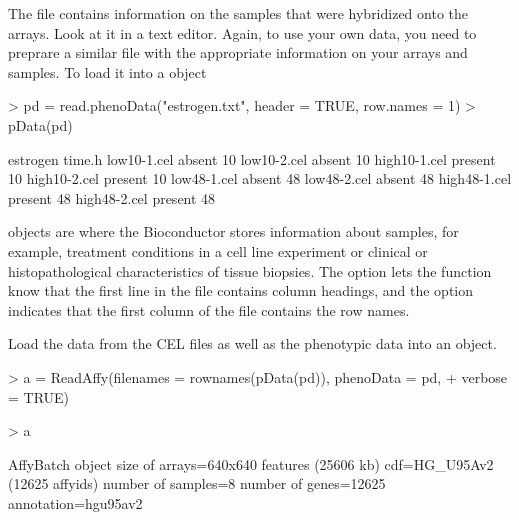 \documentclass[a4paper]{article}
\begin{document}
\begin{exercises}
\begin{exercise}
\item The file  contains information on the samples that
were hybridized onto the arrays. Look at it in a text editor. Again, to use
your own data, you need to preprare a similar file with the appropriate
information on your arrays and samples.
To load it into a  object
\begin{Schunk}
\begin{Sinput}
> pd = read.phenoData("estrogen.txt", header = TRUE, row.names = 1)
> pData(pd)
\end{Sinput}
\begin{Soutput}
             estrogen time.h
low10-1.cel    absent     10
low10-2.cel    absent     10
high10-1.cel  present     10
high10-2.cel  present     10
low48-1.cel    absent     48
low48-2.cel    absent     48
high48-1.cel  present     48
high48-2.cel  present     48
\end{Soutput}
\end{Schunk}
 objects are where the Bioconductor stores information about 
samples, for example, treatment conditions in a cell line experiment or 
clinical or histopathological characteristics of tissue biopsies. 
The  option lets the  function know that
the first line in the file contains column headings, and the 
 option indicates that the first column of the file contains 
the row names.


\item Load the data from the CEL files as well as the phenotypic data 
into an  object. 

\begin{Schunk}
\begin{Sinput}
> a = ReadAffy(filenames = rownames(pData(pd)), phenoData = pd, 
+     verbose = TRUE)
\end{Sinput}
\end{Schunk}
\begin{Schunk}
\begin{Sinput}
> a
\end{Sinput}
\begin{Soutput}
AffyBatch object
size of arrays=640x640 features (25606 kb)
cdf=HG_U95Av2 (12625 affyids)
number of samples=8
number of genes=12625
annotation=hgu95av2
\end{Soutput}
\end{Schunk}

\end{exercise}


\end{exercises}
\end{document}
